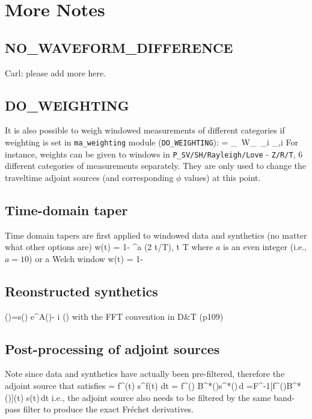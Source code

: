 \documentclass[11pt,titlepage,fleqn]{article}
\begin{document}
\section{More Notes}
\subsection{NO\_WAVEFORM\_DIFFERENCE}
Carl: please add more here.

\subsection{DO\_WEIGHTING}
It is also possible to weigh windowed measurements of different categories if weighting is set in \verb+ma_weighting+ module (\verb+DO_WEIGHTING+):
\eq
\Phi = \sum_\alpha \, W_\alpha \, \sum_i \phi_{\alpha,i} 
\en
For instance, weights can be given to windows in \verb+P_SV/SH/Rayleigh/Love+ - \verb+Z/R/T+, 6 different categories of measurements separately. They are only used to change the traveltime adjoint sources (and corresponding $\phi$ values) at this
point.

\subsection{Time-domain taper}
Time domain tapers are first applied to windowed data and synthetics (no matter what other options are)
\eq
w(t) = 1- \cos^a (2 \pi t/T), \le t \le T
\en
where $a$ is an even integer (i.e., $a=10$) or a Welch window
\eq
w(t) = 1-
\en

\subsection{Reonstructed synthetics}
\eq
{}(\om)=s(\om) e^{\Delta \ln A(\om)- i \om \Delta\tau(\om)} 
\en
with the FFT convention in D\&T (p109)

\subsection{Post-processing of adjoint sources}
Note since data and synthetics have actually been pre-filtered, therefore the adjoint source that satisfies
\eq
\delta \phi = \int f^\dagger (t) s^f(t) dt =  \int f^\dagger(\om) B^*(\om)s^*(\om)\,d\om 
=\int F^{-1}[f^\dagger(\om)B^*(\om)](t) s(t)\,dt
\en
i.e., the adjoint source also needs to be filtered by the same band-pass filter to produce the exact Fr\'{e}chet
derivatives.
\end{document}
